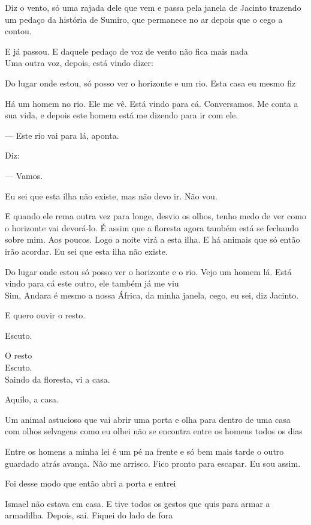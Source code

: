 Diz o vento, só uma rajada dele que vem e passa pela janela de Jacinto
trazendo um pedaço da história de Sumiro, que permanece no ar depois que
o cego a contou.

E já passou. E daquele pedaço de voz de vento não fica mais nada\\

Uma outra voz, depois, está vindo dizer:

Do lugar onde estou, só posso ver o horizonte e um rio. Esta casa eu
mesmo fiz

Há um homem no rio. Ele me vê. Está vindo para cá. Conversamos. Me conta
a sua vida, e depois este homem está me dizendo para ir com ele.

--- Este rio vai para lá, aponta.

Diz:

--- Vamos.

Eu sei que esta ilha não existe, mas não devo ir. Não vou.

E quando ele rema outra vez para longe, desvio os olhos, tenho medo de
ver como o horizonte vai devorá-lo. É assim que a floresta agora também
está se fechando sobre mim. Aos poucos. Logo a noite virá a esta ilha. E
há animais que só então irão acordar. Eu sei que esta ilha não existe.

Do lugar onde estou só posso ver o horizonte e o rio. Vejo um homem lá.
Está vindo para cá este outro, ele também já me viu\\

Sim, Andara é mesmo a nossa África, da minha janela, cego, eu sei, diz
Jacinto.

E quero ouvir o resto.

Escuto.

O resto\\

Escuto.\\

Saindo da floresta, vi a casa.

Aquilo, a casa.

Um animal astucioso que vai abrir uma porta e olha para dentro de uma
casa com olhos selvagens como eu olhei não se encontra entre os homens
todos os dias

Entre os homens a minha lei é um pé na frente e só bem mais tarde o
outro guardado atrás avança. Não me arrisco. Fico pronto para escapar.
Eu sou assim.

Foi desse modo que então abri a porta e entrei

Ismael não estava em casa. E tive todos os gestos que quis para armar a
armadilha. Depois, saí. Fiquei do lado de fora

